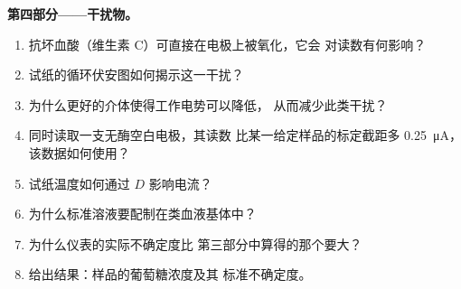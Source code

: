 \begin{problem}
\medskip\noindent\textbf{第四部分——干扰物。}
\begin{enumerate}[resume]
  \item 抗坏血酸（维生素 C）可直接在电极上被氧化，它会
        对读数有何影响？
  \item 试纸的循环伏安图如何揭示这一干扰？
  \item 为什么更好的介体使得工作电势可以降低，
        从而减少此类干扰？
  \item 同时读取一支无酶空白电极，其读数
        比某一给定样品的标定截距多 \qty{0.25}{\micro A}，
        该数据如何使用？
  \item 试纸温度如何通过 $D$ 影响电流？
  \item 为什么标准溶液要配制在类血液基体中？
  \item 为什么仪表的实际不确定度比
        第三部分中算得的那个要大？
  \item 给出结果：样品的葡萄糖浓度及其
        标准不确定度。
\end{enumerate}
\end{problem}
